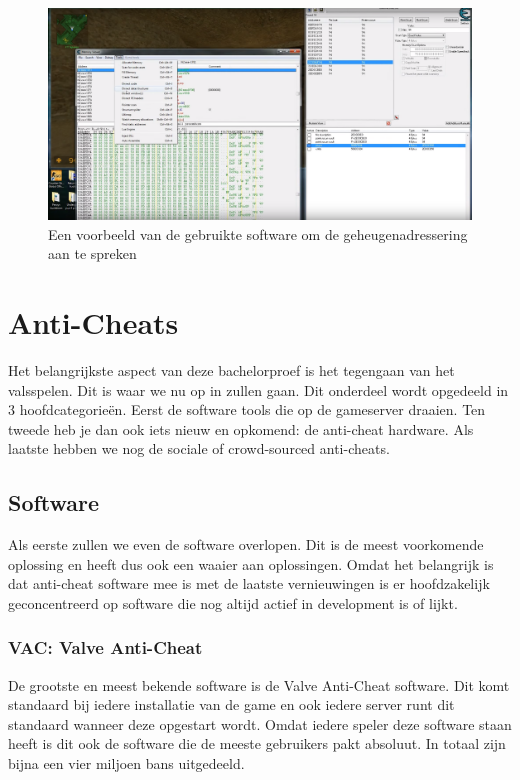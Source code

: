 \documentclass[pdftex,a4paper,12pt,twoside]{report}
\begin{document}
\begin{figure}
\centering
\includegraphics[width=15cm]{img/aimhack-code-example}
\caption{Een voorbeeld van de gebruikte software om de geheugenadressering aan te spreken}
\end{figure}


\chapter{Anti-Cheats}
\label{ch:anticheats}
Het belangrijkste aspect van deze bachelorproef is het tegengaan van het valsspelen. Dit is waar we nu op in zullen gaan. Dit onderdeel wordt opgedeeld in 3 hoofdcategorieën. Eerst de software tools die op de gameserver draaien. Ten tweede heb je dan ook iets nieuw en opkomend: de anti-cheat hardware. Als laatste hebben we nog de sociale of crowd-sourced anti-cheats.

\section{Software}
\label{sec:antisoftware}
Als eerste zullen we even de software overlopen. Dit is de meest voorkomende oplossing en heeft dus ook een waaier aan oplossingen. Omdat het belangrijk is dat anti-cheat software mee is met de laatste vernieuwingen is er hoofdzakelijk geconcentreerd op software die nog altijd actief in development is of lijkt. 

\subsection{VAC: Valve Anti-Cheat}
\label{sec:vac}
De grootste en meest bekende software is de Valve Anti-Cheat software. Dit komt standaard bij iedere installatie van de game en ook iedere server runt dit standaard wanneer deze opgestart wordt. \citep{VAC}Omdat iedere speler deze software staan heeft is dit ook de software die de meeste gebruikers pakt absoluut. In totaal zijn bijna een vier miljoen bans uitgedeeld.
\citep{steamdb}
\\
\end{document}
